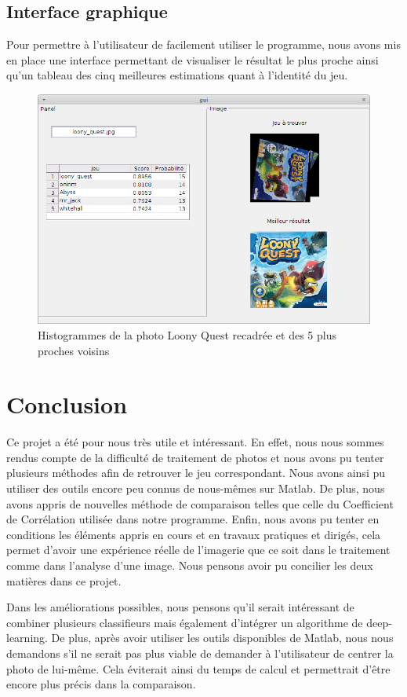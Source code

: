 \documentclass{st50_template}
\begin{document}
\subsection{Interface graphique}
Pour permettre à l'utilisateur de facilement utiliser le programme, nous avons mis en place une interface permettant de visualiser le résultat le plus proche ainsi qu'un tableau des cinq meilleures estimations quant à l'identité du jeu.

\begin{figure}[ht]
    \centering
    \includegraphics[width=\textwidth]{images/interface.png}
    \caption{Histogrammes de la photo Loony Quest recadrée et des 5 plus proches voisins}
    \label{interface}
\end{figure}


\section{Conclusion}

Ce projet a été pour nous très utile et intéressant. En effet, nous nous sommes rendus compte de la difficulté de traitement de photos et nous avons pu tenter plusieurs méthodes afin de retrouver le jeu correspondant. Nous avons ainsi pu utiliser des outils encore peu connus de nous-mêmes sur Matlab. De plus, nous avons appris de nouvelles méthode de comparaison telles que celle du Coefficient de Corrélation utilisée dans notre programme. Enfin, nous avons pu tenter en conditions les éléments appris en cours et en travaux pratiques et dirigés, cela permet d'avoir une expérience réelle de l'imagerie que ce soit dans le traitement comme dans l'analyse d'une image. Nous pensons avoir pu concilier les deux matières dans ce projet.

Dans les améliorations possibles, nous pensons qu'il serait intéressant de combiner plusieurs classifieurs mais également d'intégrer un algorithme de deep-learning. De plus, après avoir utiliser les outils disponibles de Matlab, nous nous demandons s'il ne serait pas plus viable de demander à l'utilisateur de centrer la photo de lui-même. Cela éviterait ainsi du temps de calcul et permettrait d'être encore plus précis dans la comparaison.
\end{document}
